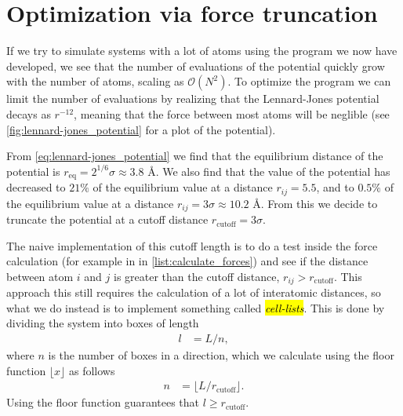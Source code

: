 
\section{Optimization via force truncation\label{sec:cell_lists}}
If we try to simulate systems with a lot of atoms using the program we now have developed, we see that the number of evaluations of the potential quickly grow with the number of atoms, scaling as $\mathcal{O}(N^2)$. To optimize the program we can limit the number of evaluations by realizing that the Lennard-Jones potential decays as $r^{-12}$, meaning that the force between most atoms will be neglible (see \cref{fig:lennard-jones_potential} for a plot of the potential). 

From \cref{eq:lennard-jones_potential} we find that the equilibrium distance of the potential is $r_{\text{eq}} =  2^{1/6}\sigma \approx 3.8 \text{~\AA}$. We also find that the value of the potential has decreased to $21\%$ of the equilibrium value at a distance $r_{ij} =  5.5$, and to $0.5\%$ of the equilibrium value at a distance $r_{ij} =  3\sigma \approx 10.2\text{~\AA}$. From this we decide to truncate the potential at a cutoff distance $r_\text{cutoff} = 3\sigma$.

The naive implementation of this cutoff length is to do a test inside the force calculation (for example in  in \cref{list:calculate_forces}) and see if the distance between atom $i$ and $j$ is greater than the cutoff distance, $r_{ij} > r_\text{cutoff}$. This approach this still requires the calculation of a lot of interatomic distances, so what we do instead is to implement something called \hl{\emph{cell-lists}}. This is done by dividing the system into boxes of length 
\begin{align*}
    l &= L/n,
\end{align*}
where $n$ is the number of boxes in a direction, which we calculate using the floor function $\lfloor x \rfloor$ as follows
\begin{align*}
    n &= \lfloor  L/r_\text{cutoff} \rfloor.
\end{align*}
Using the floor function guarantees that $l \geq r_\text{cutoff}$. 

